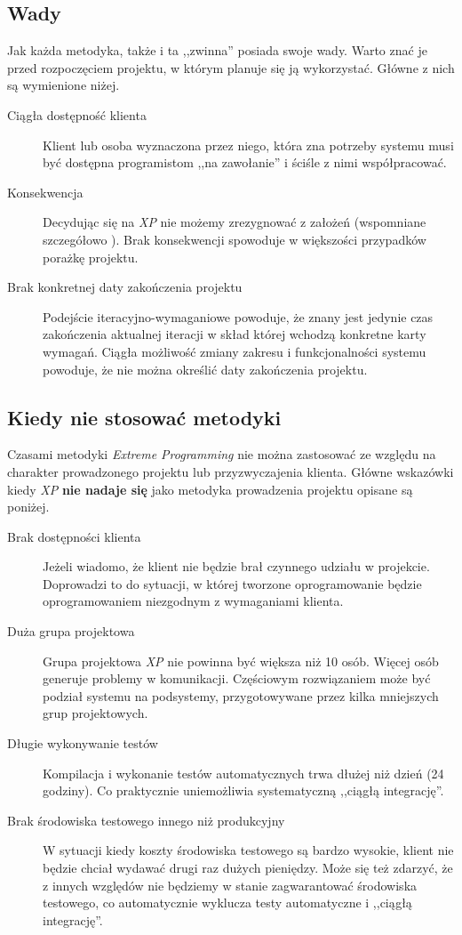 \subsection{Wady}
\label{sec:ZMTOwady}

Jak każda metodyka, także i ta ,,zwinna'' posiada swoje wady. Warto znać je przed rozpoczęciem projektu, w którym planuje się ją wykorzystać. Główne z nich są wymienione niżej.

\begin{description}
    \item[Ciągła dostępność klienta]{Klient lub osoba wyznaczona przez niego, która zna potrzeby systemu musi być dostępna programistom ,,na zawołanie'' i ściśle z nimi współpracować.}
    \item[Konsekwencja]{Decydując się na \textit{XP} nie możemy zrezygnować z założeń (wspomniane szczegółowo ). Brak konsekwencji spowoduje w większości przypadków porażkę projektu.}
    \item[Brak konkretnej daty zakończenia projektu]{Podejście iteracyjno-wymaganiowe powoduje, że znany jest jedynie czas zakończenia aktualnej iteracji w skład której wchodzą konkretne karty wymagań. Ciągła możliwość zmiany zakresu i funkcjonalności systemu powoduje, że nie można określić daty zakończenia projektu.}
\end{description}

\subsection{Kiedy nie stosować metodyki}
\label{sec:ZMTOknsm}

Czasami metodyki \textit{Extreme Programming} nie można zastosować ze względu na charakter prowadzonego projektu lub przyzwyczajenia klienta. Główne wskazówki kiedy \textit{XP} \textbf{nie nadaje się} jako metodyka prowadzenia projektu opisane są poniżej.

\begin{description}
    \item[Brak dostępności klienta]Jeżeli wiadomo, że klient nie będzie brał czynnego udziału w projekcie. Doprowadzi to do sytuacji, w której tworzone oprogramowanie będzie oprogramowaniem niezgodnym z wymaganiami klienta.
    \item[Duża grupa projektowa] Grupa projektowa \textit{XP} nie powinna być większa niż 10 osób. Więcej osób generuje problemy w komunikacji. Częściowym rozwiązaniem może być podział systemu na podsystemy, przygotowywane przez kilka mniejszych grup projektowych.
    \item[Długie wykonywanie testów] Kompilacja i wykonanie testów automatycznych trwa dłużej niż dzień (24 godziny). Co praktycznie uniemożliwia systematyczną ,,ciągłą integrację''.
    \item[Brak środowiska testowego innego niż produkcyjny] W sytuacji kiedy koszty środowiska testowego są bardzo wysokie, klient nie będzie chciał wydawać drugi raz dużych pieniędzy. Może się też zdarzyć, że z innych względów nie będziemy w stanie zagwarantować środowiska testowego, co automatycznie wyklucza testy automatyczne i ,,ciągłą integrację''.
\end{description}

